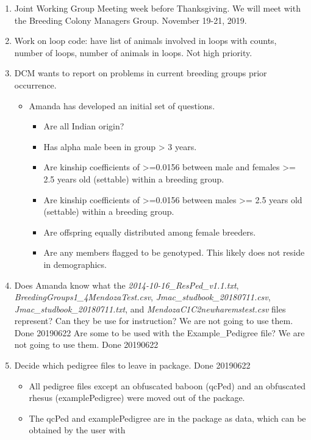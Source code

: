 \documentclass[
]{article}
\providecommand{\tightlist}{%
  \setlength{\itemsep}{0pt}\setlength{\parskip}{0pt}}
\begin{document}
\begin{enumerate}
\def\labelenumi{\arabic{enumi}.}
\item
  Joint Working Group Meeting week before Thanksgiving. We will meet
  with the Breeding Colony Managers Group. November 19-21, 2019.
\item
  Work on loop code: have list of animals involved in loops with counts,
  number of loops, number of animals in loops. Not high priority.
\item
  DCM wants to report on problems in current breeding groups prior
  occurrence.

  \begin{itemize}
  \tightlist
  \item
    Amanda has developed an initial set of questions.

    \begin{itemize}
    \tightlist
    \item
      Are all Indian origin?
    \item
      Has alpha male been in group \textgreater{} 3 years.
    \item
      Are kinship coefficients of \textgreater=0.0156 between male and
      females \textgreater= 2.5 years old (settable) within a breeding
      group.
    \item
      Are kinship coefficients of \textgreater=0.0156 between males
      \textgreater= 2.5 years old (settable) within a breeding group.
    \item
      Are offspring equally distributed among female breeders.
    \item
      Are any members flagged to be genotyped. This likely does not
      reside in demographics.
    \end{itemize}
  \end{itemize}
\item
  Does Amanda know what the \emph{2014-10-16\_ResPed\_v1.1.txt},
  \emph{BreedingGroups1\_4MendozaTest.csv},
  \emph{Jmac\_studbook\_20180711.csv},
  \emph{Jmac\_studbook\_20180711.txt}, and
  \emph{MendozaC1C2newharemstest.csv} files represent? Can they be use
  for instruction? We are not going to use them. Done 20190622 Are some
  to be used with the Example\_Pedigree file? We are not going to use
  them. Done 20190622
\item
  Decide which pedigree files to leave in package. Done 20190622

  \begin{itemize}
  \tightlist
  \item
    All pedigree files except an obfuscated baboon (qcPed) and an
    obfuscated rhesus (examplePedigree) were moved out of the package.
  \item
    The qcPed and examplePedigree are in the package as data, which can
    be obtained by the user with


\end{itemize}
\end{enumerate}
\end{document}
